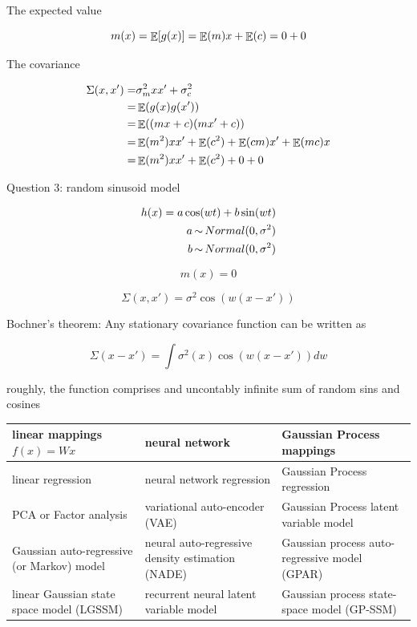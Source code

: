 \documentclass[b5paper]{report}
\begin{document}
The expected value

\begin{equation}
  m(x) = \operatorname*{\mathbb{\mathop{E}}}[g(x)] = \operatorname*{\mathbb{\mathop{E}}}(m)x + \operatorname*{\mathbb{\mathop{E}}}(c) = 0 + 0
\end{equation}

The covariance

\begin{align}
  \Sigma(x, x') =& \sigma_m^2 xx' + \sigma_c^2 \\
  =& \operatorname*{\mathbb{\mathop{E}}}(g(x)g(x')) \\
=& \operatorname*{\mathbb{\mathop{E}}}(( mx + c)(mx' + c)) \\
=& \operatorname*{\mathbb{\mathop{E}}}(m^2)xx' + \operatorname*{\mathbb{\mathop{E}}}(c^2) + \operatorname*{\mathbb{\mathop{E}}}(cm)x' + \operatorname*{\mathbb{\mathop{E}}}(mc)x \\
=& \operatorname*{\mathbb{\mathop{E}}}(m^2)xx' + \operatorname*{\mathbb{\mathop{E}}}(c^2) + 0 + 0
\end{align}

Question 3: random sinusoid model

\begin{align}
  h(x) = a \cos(wt) + b \sin(wt) \\
  a \operatorname*{\sim} Normal(0, \sigma^2) \\
  b \operatorname*{\sim} Normal(0, \sigma^2)
\end{align}

\begin{equation}
  m(x) = 0
\end{equation}

\begin{equation}
  \Sigma(x,x') = \sigma^2\cos(w(x-x'))
\end{equation}

Bochner's theorem: Any stationary covariance function can be written as

\begin{equation}
  \Sigma(x - x') = \int \sigma^2 (x) \cos(w(x-x'))dw
\end{equation}

roughly, the function comprises and uncontably infinite sum of random sins and
cosines


\begin{table}[h]
  \def\arraystretch{2.0}
  \centering
  \begin{tabular}{p{.3\linewidth}|p{.3\linewidth}|p{.3\linewidth}}
    linear mappings $f(x) = Wx$ & neural network & Gaussian Process mappings \\
    \hline
    linear regression & neural network regression & Gaussian Process regression \\
    PCA or Factor analysis & variational auto-encoder (VAE) & Gaussian Process latent variable model \\
    Gaussian auto-regressive (or Markov) model & neural auto-regressive density estimation (NADE) & Gaussian process auto-regressive model (GPAR) \\
    linear Gaussian state space model (LGSSM) & recurrent neural latent variable model & Gaussian process state-space model (GP-SSM)
  \end{tabular}
\end{table}
\end{document}
